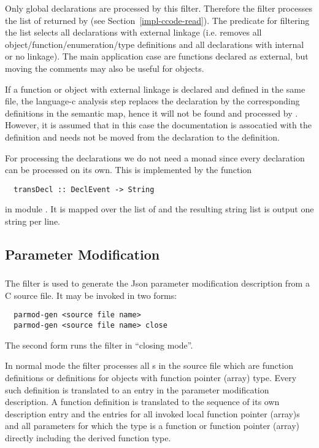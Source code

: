 Only global declarations are processed by this filter. Therefore the filter processes the list of 
returned by  (see Section~\ref{impl-ccode-read}). The predicate for filtering the list
selects all declarations with external linkage (i.e. removes all object/function/enumeration/type definitions and 
all declarations with internal or no linkage). 
The main application case are functions declared as external, but moving the comments may also be useful for 
objects.

If a function or object with external linkage is declared and defined in the same file, the language-c analysis step
replaces the declaration by the corresponding definitions in the semantic map, hence it will not be found and processed
by . However, it is assumed that in this case the documentation is assocatied with the definition
and needs not be moved from the declaration to the definition.

For processing the declarations we do not need a monad since every declaration can be processed on its own. This is implemented
by the function
\begin{verbatim}
  transDecl :: DeclEvent -> String
\end{verbatim}
in module . It is mapped over the list of  and the resulting string list
is output one string per line.

\subsection{Parameter Modification}
\label{impl-ccomps-parmod}

\subsubsection{}

The filter  is used to generate the Json parameter modification description from a C source file.
It may be invoked in two forms:
\begin{verbatim}
  parmod-gen <source file name>
  parmod-gen <source file name> close
\end{verbatim}
The second form runs the filter in ``closing mode''.

In normal mode the filter processes all s in the source file which are function
definitions or definitions for objects with function pointer (array) type. Every such definition is translated to an
entry in the parameter modification description. A function definition is translated to the sequence of its
own description entry and the entries for all invoked local function pointer (array)s and all parameters for which
the type is a function or function pointer (array) directly including the derived function type.

